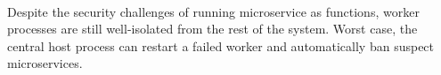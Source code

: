 %


~\\
Despite the security challenges of running microservice as functions, worker
processes are still well-isolated from the rest of the system.
Worst case, the central host process can restart a failed worker and
automatically ban suspect microservices.
